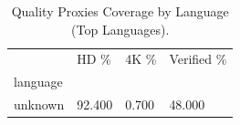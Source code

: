 \begin{table}[htbp]
\centering
\caption{Quality Proxies Coverage by Language (Top Languages).}
\label{tab:eda_quality_by_language}
\begin{tabular}{llll}
\toprule
 & HD \% & 4K \% & Verified \% \\
language &  &  &  \\
\midrule
unknown & 92.400 & 0.700 & 48.000 \\
\bottomrule
\end{tabular}

\end{table}